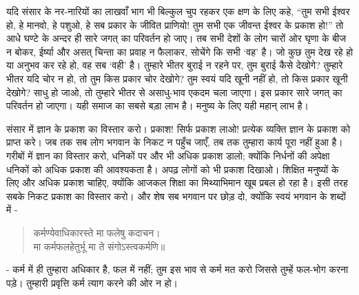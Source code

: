यदि संसार के नर-नारियों का लाखवाँ भाग भी बिल्कुल चुप रहकर एक क्षण के लिए कहे, “तुम सभी ईश्वर हो, हे मानवो, हे पशुओ, हे सब प्रकार के जीवित प्राणियो! तुम सभी एक जीवन्त ईश्वर के प्रकाश हो!” तो आधे घण्टे के अन्दर ही सारे जगत् का परिवर्तन हो जाए। तब सभी देशों के लोग चारों ओर घृणा के बीज न बोकर, ईर्ष्या और असत् चिन्ता का प्रवाह न फैलाकर, सोचेंगे कि सभी ‘वह’ है। जो कुछ तुम देख रहे हो या अनुभव कर रहे हो, वह सब ‘वही’ है। तुम्हारे भीतर बुराई न रहने पर, तुम बुराई कैसे देखोगे? तुम्हारे भीतर यदि चोर न हो, तो तुम किस प्रकार चोर देखोगे? तुम स्वयं यदि खूनी नहीं हो, तो किस प्रकार खूनी देखोगे? साधु हो जाओ, तो तुम्हारे भीतर से असाधु-भाव एकदम चला जाएगा। इस प्रकार सारे जगत् का परिवर्तन हो जाएगा। यही समाज का सबसे बड़ा लाभ है। मनुष्य के लिए यही महान् लाभ है। 

संसार में ज्ञान के प्रकाश का विस्तार करो। प्रकाश! सिर्फ प्रकाश लाओ! प्रत्येक व्यक्ति ज्ञान के प्रकाश को प्राप्त करे। जब तक सब लोग भगवान के निकट न पहुँच जाएँ, तब तक तुम्हारा कार्य पूरा नहीं हुआ है। गरीबों में ज्ञान का विस्तार करो, धनिकों पर और भी अधिक प्रकाश डालो; क्योंकि निर्धनों की अपेक्षा धनिकों को अधिक प्रकाश की आवश्यकता है। अपढ़ लोगों को भी प्रकाश दिखाओ। शिक्षित मनुष्यों के लिए और अधिक प्रकाश चाहिए, क्योंकि आजकल शिक्षा का मिथ्याभिमान खूब प्रबल हो रहा है। इसी तरह सबके निकट प्रकाश का विस्तार करो। और शेष सब भगवान पर छोड़ दो, क्योंकि स्वयं भगवान के शब्दों में -

\begin{verse}
कर्मण्येवाधिकारस्ते मा फलेषु कदाचन।\\मा कर्मफलहेतुर्भू मा ते संगोऽस्त्वकर्मणि॥  
\end{verse}

- कर्म में ही तुम्हारा अधिकार है, फल में नहीं; तुम इस भाव से कर्म मत करो जिससे तुम्हें फल-भोग करना पड़े। तुम्हारी प्रवृत्ति कर्म त्याग करने की ओर न हो। 

\delimiter

\addtoendnotes{\protect\end{multicols}}


